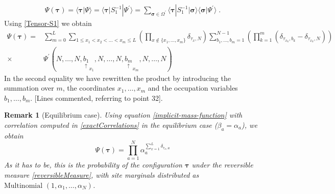 \documentclass[10pt]{article}
\numberwithin{equation}{section}
\numberwithin{equation}{subsection}
\newtheorem{remark}{Remark}
\newcommand{\dt}{\;.}
\newcommand{\fra}[1]{\textcolor[rgb]{0,0,1}{#1}}
\begin{document}
{
	\begin{align}
		\Psi(\bm{\tau})=\langle \bm{\tau}|\Psi\rangle=\langle \bm{\tau}|S^{-1}_{1}|\Psi^{'}\rangle=\sum_{\bm{\sigma}\in \Omega^{'}}\langle \bm{\tau}|S_{1}^{-1}|\bm{\sigma}\rangle \langle \bm{\sigma}|\Psi^{'}\rangle\dt
	\end{align} 
	Using \eqref{Tensor-S1} we obtain 
			 \begin{align}\label{implicit-PSI-PSIp}
			\Psi(\bm{\tau})=&\sum_{m=0}^{L}\sum_{1\leq x_{1}<x_{2}<\ldots<x_{m}\leq L}\left(\prod_{x\notin\{x_{1},\ldots,x_{m}\}}\delta_{\tau_{x},N}\right)\sum_{b_{1},\ldots,b_{m}=1}^{N-1}\left(\prod_{k=1}^{m}(\delta_{\tau_{x_{k}},b_{k}}-\delta_{\tau_{x_{k}},N})\right)\nonumber\\
			\times &			
			\Psi^{'}(N,\ldots,N,\underset{\uparrow}{b_{1}}_{x_{1}},N,\ldots,N,\underset{\uparrow}{b_{m}}_{x_{m}},N,\ldots,N)
		\end{align} 
			In the second equality we have rewritten the product by introducing the summation over $m$, the coordinates $x_{1},\ldots,x_{m}$ and the occupation variables $b_{1},\ldots,b_{m}$. \fra{[Lines commented, referring to point 32]}.
\begin{remark}[Equilibrium case]
	Using equation \eqref{implicit-mass-function} with correlation computed in \eqref{exactCorrelations} in the equilibrium case ($\beta_{a}=\alpha_{a}$), we obtain 
	\begin{equation}
		\Psi(\bm{\tau})=\prod_{a=1}^{N}\alpha_{a}^{\sum_{x=1}^{L}\delta_{\tau_{x},a}}
	\end{equation}
As it has to be, this is the probability of the configuration $\bm{\tau}$ under the reversible measure \eqref{reversibleMeasure}, with site marginals distributed as $\text{Multinomial }(1,\alpha_{1},\ldots,\alpha_{N})$. 
\end{remark}
}
\end{document}
